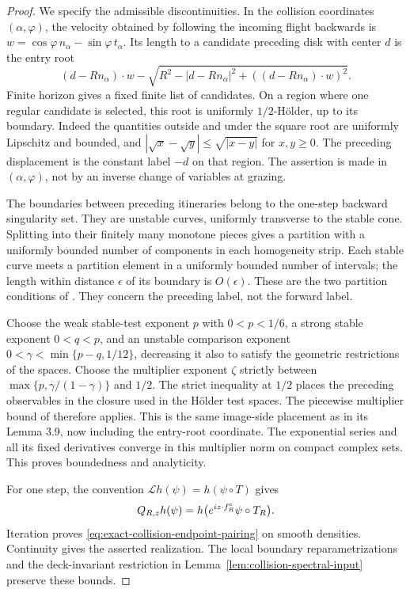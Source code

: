 \begin{proof}
We specify the admissible discontinuities. In the collision coordinates
$(\alpha,\varphi)$, the velocity obtained by following the incoming
flight backwards is
$w=\cos\varphi\,n_\alpha-\sin\varphi\,t_\alpha$. Its length to a
candidate preceding disk with center $d$ is the entry root
\[
 (d-Rn_\alpha)\cdot w-
 \sqrt{R^2-|d-Rn_\alpha|^2+((d-Rn_\alpha)\cdot w)^2}.
\]
Finite horizon gives a fixed finite list of candidates. On a region
where one regular candidate is selected, this root is uniformly
$1/2$-H\"older, up to its boundary. Indeed the quantities outside and
under the square root are uniformly Lipschitz and bounded, and
$|\sqrt x-\sqrt y|\le\sqrt{|x-y|}$ for $x,y\ge0$.
The preceding displacement is the constant label $-d$ on that region.
The assertion is made in $(\alpha,\varphi)$, not by an inverse change
of variables at grazing.

The boundaries between preceding itineraries belong to the one-step
backward singularity set. They are unstable curves, uniformly
transverse to the stable cone. Splitting into their finitely many
monotone pieces gives a partition with a uniformly bounded number of
components in each homogeneity strip. Each stable curve meets a
partition element in a uniformly bounded number of intervals; the
length within distance $\epsilon$ of its boundary is $O(\epsilon)$.
These are the two partition conditions of \cite[Lemma 3.3]{DPZ}.
They concern the preceding label, not the forward label.

Choose the weak stable-test exponent $p$ with $0<p<1/6$, a strong
stable exponent $0<q<p$, and an unstable comparison exponent
$0<\gamma<\min\{p-q,1/12\}$, decreasing it also to satisfy the
geometric restrictions of the spaces. Choose the multiplier exponent
$\zeta$ strictly between $\max\{p,\gamma/(1-\gamma)\}$ and $1/2$.
The strict inequality at $1/2$ places the preceding observables in the
closure used in the H\"older test spaces. The piecewise multiplier
bound of \cite[Lemma 3.3(b)]{DPZ} therefore applies. This is the same
image-side placement as in its Lemma 3.9, now including the entry-root
coordinate. The exponential series and all its fixed derivatives
converge in this multiplier norm on compact complex sets. This proves
boundedness and analyticity.

For one step, the convention $\mathcal L h(\psi)=h(\psi\circ T)$ gives
\[
 Q_{R,z}h(\psi)
 =h\bigl(e^{iz\cdot f_R^{\rm c}}\psi\circ T_R\bigr).
\]
Iteration proves \eqref{eq:exact-collision-endpoint-pairing} on
smooth densities. Continuity gives the asserted realization. The local
boundary reparametrizations and the deck-invariant restriction in
Lemma~\ref{lem:collision-spectral-input} preserve these bounds.
\end{proof}


